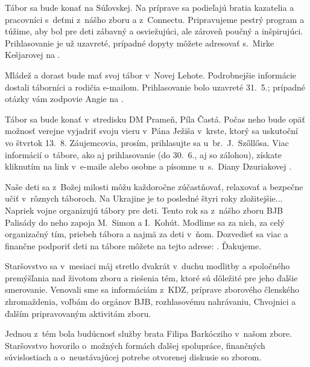 Tábor sa bude konať na Súľovskej. Na príprave sa podieľajú bratia kazatelia a pracovníci s~deťmi z~nášho zboru a z~Connectu. Pripravujeme pestrý program a túžime, aby bol pre deti zábavný a osviežujúci, ale zároveň poučný a inšpirujúci.
Prihlasovanie je už uzavreté, prípadné dopyty môžete adresovať s.~Mirke Kešjarovej na .

Mládež a dorast bude mať svoj tábor v~Novej Lehote. Podrobnejšie informácie dostali táborníci a rodičia e-mailom. Prihlasovanie bolo uzavreté 31.~5.; prípadné otázky vám zodpovie Angie na .

Tábor sa bude konať v~stredisku DM Prameň, Píla Častá. Počas neho bude opäť možnosť verejne vyjadriť svoju vieru v~Pána Ježiša v~krste, ktorý sa uskutoční vo štvrtok 13.~8.
Záujemcovia, prosím, prihlasujte sa u~br.~J.~Szőllősa.
Viac informácií o~tábore, ako aj prihlasovanie (do 30.~6., aj so zálohou), získate kliknutím na link v~e-maile alebo osobne a písomne u~s.~Diany Dzuriakovej .


Naše deti sa z~Božej milosti môžu každoročne zúčastňovať, relaxovať a bezpečne učiť v~rôznych táboroch. Na Ukrajine je to posledné štyri roky zložitejšie... Napriek vojne organizujú tábory pre deti. Tento rok sa z~nášho zboru BJB Palisády do neho zapoja M.~Simon a I.~Kohút.
Modlime sa za nich, za celý organizačný tím, priebeh tábora a najmä za deti v~ňom. Dozvedieť sa viac a finančne podporiť deti na tábore môžete na tejto adrese: . Ďakujeme.




Staršovstvo sa v~mesiaci máj stretlo dvakrát v~duchu modlitby a spoločného premýšľania nad životom zboru a riešenia tém, ktoré sú dôležité pre jeho ďalšie smerovanie. Venovali sme sa informáciám z~KDZ, príprave zborového členského zhromaždenia, voľbám do orgánov BJB, rozhlasovému nahrávaniu, Chvojnici a ďalším pripravovaným aktivitám zboru.

Jednou z~tém bola budúcnosť služby brata Filipa Barkócziho v~našom zbore. Staršovstvo hovorilo o~možných formách ďalšej spolupráce, finančných súvislostiach a o~neustávajúcej potrebe otvorenej diskusie so zborom.

